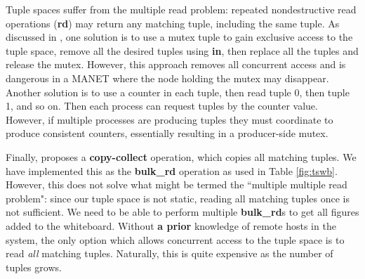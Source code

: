 \documentclass{llncs}
\begin{document}
Tuple spaces suffer from the multiple read problem\cite{mrdp}: repeated nondestructive read operations (\textbf{rd}) may return any matching tuple, including the same tuple. As discussed in \cite{mrdp}, one solution is to use a mutex tuple to gain exclusive access to the tuple space, remove all the desired tuples using \textbf{in}, then replace all the tuples and release the mutex. However, this approach removes all concurrent access and is dangerous in a MANET where the node holding the mutex may disappear. Another solution is to use a counter in each tuple, then read tuple 0, then tuple 1, and so on. Then each process can request tuples by the counter value. However, if multiple processes are producing tuples they must coordinate to produce consistent counters, essentially resulting in a producer-side mutex.

Finally, \cite{mrdp} proposes a \textbf{copy-collect} operation, which copies all matching tuples. We have implemented this as the \textbf{bulk\_rd} operation as used in Table \ref{fig:tswb}. However, this does not solve what might be termed the ``multiple multiple read problem": since our tuple space is not static, reading all matching tuples once is not sufficient. We need to be able to perform multiple \textbf{bulk\_rd}s to get all figures added to the whiteboard. Without \textbf{a prior} knowledge of remote hosts in the system, the only option which allows concurrent access to the tuple space is to read \textit{all} matching tuples. Naturally, this is quite expensive as the number of tuples grows. 
\end{document}
